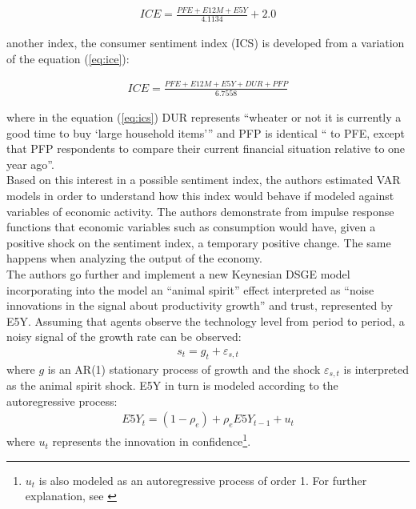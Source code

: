 \begin{align} \label{eq:ice}
    ICE = \frac{PFE + E12M + E5Y}{4.1134} + 2.0
\end{align}

another index, the consumer sentiment index (ICS) is developed from a variation of the equation (\ref{eq:ice}):

\begin{align} \label{eq:ics}
    ICE = \frac{PFE + E12M + E5Y + DUR + PFP}{6.7558}
\end{align}

where in the equation (\ref{eq:ics}) DUR represents ``wheater or not it is currently a good time to buy `large household items''' \cite[p.1372]{barsky2012information} and PFP is identical `` to PFE, except that PFP respondents to compare their current financial situation relative to one year ago''\cite[p.1372]{barsky2012information}.\\

Based on this interest in a possible sentiment index, the authors estimated VAR models in order to understand how this index would behave if modeled against variables of economic activity. The authors demonstrate from impulse response functions that economic variables such as consumption would have, given a positive shock on the sentiment index, a temporary positive change. The same happens when analyzing the output of the economy.\\

The authors go further and implement a new Keynesian DSGE model incorporating into the model an ``animal spirit'' effect interpreted as ``noise innovations in the signal about productivity growth''\cite[p.1353]{barsky2012information} and trust, represented by E5Y. Assuming that agents observe the technology level from period to period, a noisy signal of the growth rate can be observed:
\begin{align*}
     s_t = g_t + \varepsilon_{s,t}
\end{align*}
where $g$ is an AR(1) stationary process of growth and the shock $\varepsilon_{s,t}$ is interpreted as the animal spirit shock. E5Y in turn is modeled according to the autoregressive process:
\begin{align*}
     E5Y_t = (1 - \rho_e) + \rho_e E5Y_{t-1} + u_t
\end{align*}
where $u_t$ represents the innovation in confidence\footnote{$u_t$ is also modeled as an autoregressive process of order 1. For further explanation, see \cite[p.1354]{barsky2012information}}.\\

